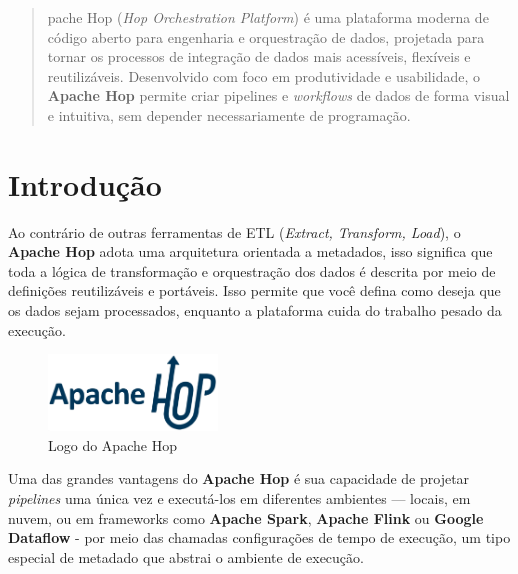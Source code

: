 \documentclass[a4paper,11pt]{article}
\begin{document}
	
\maketitle %
\thispagestyle{fancy} %


\begin{abstract}	
	pache Hop (\textit{Hop Orchestration Platform}) é uma plataforma moderna de código aberto para engenharia e orquestração de dados, projetada para tornar os processos de integração de dados mais acessíveis, flexíveis e reutilizáveis. Desenvolvido com foco em produtividade e usabilidade, o \textbf{Apache Hop} permite criar pipelines e \textit{workflows} de dados de forma visual e intuitiva, sem depender necessariamente de programação.
\end{abstract}

\section{Introdução}
Ao contrário de outras ferramentas de ETL (\textit{Extract, Transform, Load}), o \textbf{Apache Hop} adota uma arquitetura orientada a metadados, isso significa que toda a lógica de transformação e orquestração dos dados é descrita por meio de definições reutilizáveis e portáveis. Isso permite que você defina como deseja que os dados sejam processados, enquanto a plataforma cuida do trabalho pesado da execução.
\begin{figure}[!htb]
	\centering
	\includegraphics[width=0.4\textwidth]{imagens/Logo}
	\caption{Logo do Apache Hop}
\end{figure}

Uma das grandes vantagens do \textbf{Apache Hop} é sua capacidade de projetar \textit{pipelines} uma única vez e executá-los em diferentes ambientes — locais, em nuvem, ou em frameworks como \textbf{Apache Spark}, \textbf{Apache Flink} ou \textbf{Google Dataflow} - por meio das chamadas configurações de tempo de execução, um tipo especial de metadado que abstrai o ambiente de execução.
\end{document}
